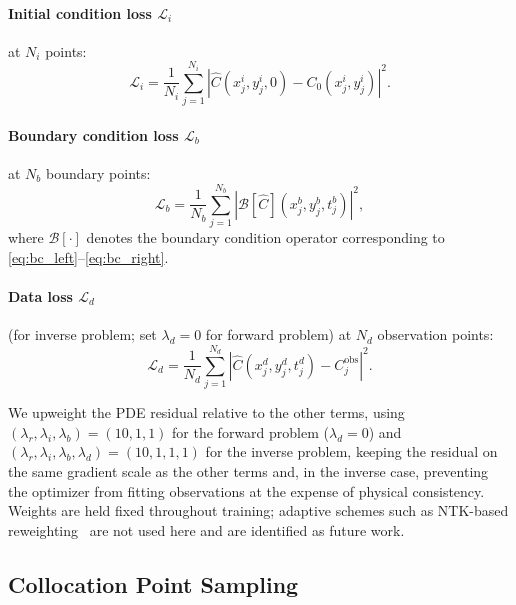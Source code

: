 \documentclass[12pt]{article}
\begin{document}
\paragraph{Initial condition loss $\mathcal{L}_i$} at
$N_i$ points:
\begin{equation}
  \mathcal{L}_i = \frac{1}{N_i} \sum_{j=1}^{N_i}
  \left| \hat{C}(x_j^i, y_j^i, 0) - C_0(x_j^i, y_j^i) \right|^2.
  \label{eq:loss_i}
\end{equation}

\paragraph{Boundary condition loss $\mathcal{L}_b$} at
$N_b$ boundary points:
\begin{equation}
  \mathcal{L}_b = \frac{1}{N_b} \sum_{j=1}^{N_b}
  \left| \mathcal{B}[\hat{C}](x_j^b, y_j^b, t_j^b) \right|^2,
  \label{eq:loss_b}
\end{equation}
where $\mathcal{B}[\cdot]$ denotes the boundary condition
operator corresponding to \eqref{eq:bc_left}--\eqref{eq:bc_right}.

\paragraph{Data loss $\mathcal{L}_d$} (for inverse problem;
set $\lambda_d = 0$ for forward problem) at $N_d$ observation
points:
\begin{equation}
  \mathcal{L}_d = \frac{1}{N_d} \sum_{j=1}^{N_d}
  \left| \hat{C}(x_j^d, y_j^d, t_j^d) - C_j^{\text{obs}} \right|^2.
  \label{eq:loss_d}
\end{equation}

We upweight the PDE residual relative to the other terms,
using $(\lambda_r, \lambda_i, \lambda_b) = (10, 1, 1)$ for the
forward problem ($\lambda_d = 0$) and
$(\lambda_r, \lambda_i, \lambda_b, \lambda_d) = (10, 1, 1, 1)$
for the inverse problem, keeping the residual on the same
gradient scale as the other terms and, in the inverse case,
preventing the optimizer from fitting observations at the
expense of physical consistency. Weights are held fixed
throughout training; adaptive schemes such as NTK-based
reweighting~\cite{Wang2021} are not used here and are
identified as future work.

\subsection{Collocation Point Sampling}
\label{sec:sampling}
\end{document}
